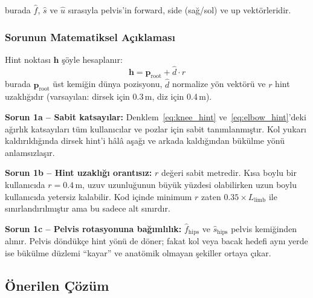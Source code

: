 \documentclass[11pt,a4paper]{article}
\begin{document}
burada $\hat{f}$, $\hat{s}$ ve $\hat{u}$ s{\i}ras{\i}yla pelvis'in forward,
side (sa\u{g}/sol) ve up vekt\"orleridir.

\subsubsection{Sorunun Matematiksel A\c{c}{\i}klamas{\i}}

Hint noktas{\i} $\mathbf{h}$ \c{s}\"oyle hesaplan{\i}r:
\begin{equation}
    \mathbf{h} = \mathbf{p}_{\text{root}} + \hat{d} \cdot r
    \label{eq:hint_pos}
\end{equation}
burada $\mathbf{p}_{\text{root}}$ \"ust kemi\u{g}in d\"unya pozisyonu, $\hat{d}$
normalize y\"on vekt\"or\"u ve $r$ hint uzakl{\i}\u{g}{\i}d{\i}r (varsay{\i}lan:
dirsek i\c{c}in 0.3\,m, diz i\c{c}in 0.4\,m).

\textbf{Sorun 1a -- Sabit katsay{\i}lar:} Denklem~\ref{eq:knee_hint}
ve~\ref{eq:elbow_hint}'deki a\u{g}{\i}rl{\i}k katsay{\i}lar{\i} t\"um
kullan{\i}c{\i}lar ve pozlar i\c{c}in sabit tan{\i}mlanm{\i}\c{s}t{\i}r. Kol yukar{\i}
kald{\i}r{\i}ld{\i}\u{g}{\i}nda dirsek hint'i h\^al\^a a\c{s}a\u{g}{\i} ve arkada kald{\i}\u{g}{\i}ndan
b\"uk\"ulme y\"on\"u anlams{\i}zla\c{s}{\i}r.

\textbf{Sorun 1b -- Hint uzakl{\i}\u{g}{\i} orant{\i}s{\i}z:}
$r$ de\u{g}eri sabit metredir. K{\i}sa boylu bir kullan{\i}c{\i}da
$r = 0.4$\,m, uzuv uzunlu\u{g}unun b\"uy\"uk y\"uzdesi olabilirken
uzun boylu kullan{\i}c{\i}da yetersiz kalabilir.
Kod i\c{c}inde minimum $r$ zaten $0.35 \times L_{\text{limb}}$ ile
s{\i}n{\i}rland{\i}r{\i}lm{\i}\c{s}t{\i}r ama bu sadece alt s{\i}n{\i}rd{\i}r.

\textbf{Sorun 1c -- Pelvis rotasyonuna ba\u{g}{\i}ml{\i}l{\i}k:}
$\hat{f}_{\text{hips}}$ ve $\hat{s}_{\text{hips}}$ pelvis
kemi\u{g}inden al{\i}n{\i}r. Pelvis d\"ond\"uk\c{c}e hint y\"on\"u de
d\"oner; fakat kol veya bacak hedefi ayn{\i} yerde ise b\"uk\"ulme
d\"uzlemi ``kayar'' ve anat\"omik olmayan \c{s}ekiller ortaya \c{c}{\i}kar.

\subsection{\"Onerilen \c{C}\"oz\"um}
\end{document}

